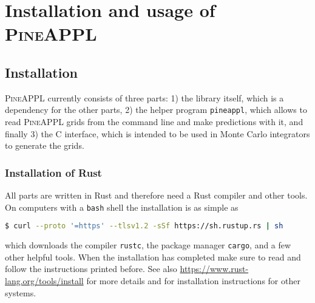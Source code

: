 \section{Installation and usage of \texorpdfstring{\textsc{PineAPPL}}{PineAPPL}}

%

\subsection{Installation}
\label{app:installation}

\textsc{PineAPPL} currently consists of three parts: 1) the library itself, which is a dependency for the other parts, 2) the helper program \texttt{pineappl}, which allows to read \textsc{PineAPPL} grids from the command line and make predictions with it, and finally 3) the C interface, which is intended to be used in Monte Carlo integrators to generate the grids.

\subsubsection*{Installation of Rust}


All parts are written in Rust and therefore need a Rust compiler and other tools.
On computers with a \texttt{bash} shell the installation is as simple as
\begin{lstlisting}[language=bash]
 $ curl --proto '=https' --tlsv1.2 -sSf https://sh.rustup.rs | sh
\end{lstlisting}
which downloads the compiler \texttt{rustc}, the package manager \texttt{cargo}, and a few other helpful tools.
When the installation has completed make sure to read and follow the instructions printed before.
See also \url{https://www.rust-lang.org/tools/install} for more details and for installation instructions for other systems.

